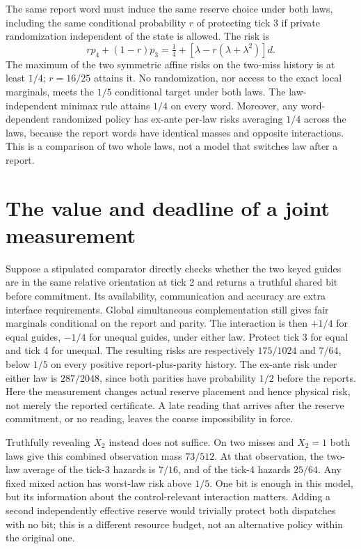 \documentclass[11pt]{article}
\begin{document}
The same report word must induce the same reserve choice under both laws, including the same conditional probability $r$ of protecting tick 3 if private randomization independent of the state is allowed. The risk is
\[
r p_4+(1-r)p_3=\tfrac14+[\lambda-r(\lambda+\lambda^2)]d.
\]
The maximum of the two symmetric affine risks on the two-miss history is at least $1/4$; $r=16/25$ attains it. No randomization, nor access to the exact local marginals, meets the $1/5$ conditional target under both laws. The law-independent minimax rule attains $1/4$ on every word. Moreover, any word-dependent randomized policy has ex-ante per-law risks averaging $1/4$ across the laws, because the report words have identical masses and opposite interactions. This is a comparison of two whole laws, not a model that switches law after a report.

\section{The value and deadline of a joint measurement}
Suppose a stipulated comparator directly checks whether the two keyed guides are in the same relative orientation at tick 2 and returns a truthful shared bit before commitment. Its availability, communication and accuracy are extra interface requirements. Global simultaneous complementation still gives fair marginals conditional on the report and parity. The interaction is then $+1/4$ for equal guides, $-1/4$ for unequal guides, under either law. Protect tick 3 for equal and tick 4 for unequal. The resulting risks are respectively $175/1024$ and $7/64$, below $1/5$ on every positive report-plus-parity history. The ex-ante risk under either law is $287/2048$, since both parities have probability $1/2$ before the reports. Here the measurement changes actual reserve placement and hence physical risk, not merely the reported certificate. A late reading that arrives after the reserve commitment, or no reading, leaves the coarse impossibility in force.

Truthfully revealing $X_2$ instead does not suffice. On two misses and $X_2=1$ both laws give this combined observation mass $73/512$. At that observation, the two-law average of the tick-3 hazards is $7/16$, and of the tick-4 hazards $25/64$. Any fixed mixed action has worst-law risk above $1/5$. One bit is enough in this model, but its information about the control-relevant interaction matters. Adding a second independently effective reserve would trivially protect both dispatches with no bit; this is a different resource budget, not an alternative policy within the original one.
\end{document}
